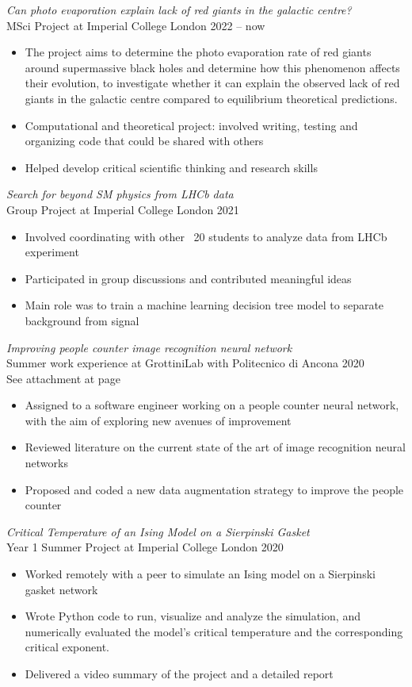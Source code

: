 \documentclass{res} %
\begin{document}
\begin{resume}
{\sl Can photo evaporation explain lack of red giants in the galactic centre?}\\ MSci Project at Imperial College London \hfill 2022 -- now
\begin{itemize}
\item The project aims to determine the photo evaporation rate of red giants around supermassive black holes and determine how this phenomenon affects their evolution, to investigate whether it can explain the observed lack of red giants in the galactic centre compared to equilibrium theoretical predictions.
\item Computational and theoretical project: involved writing, testing and organizing code that could be shared with others
\item Helped develop critical scientific thinking and research skills
\end{itemize}

{\sl Search for beyond SM physics from LHCb data}\\ Group Project at Imperial College London \hfill 2021
\begin{itemize}
\item Involved coordinating with other ~20 students to analyze data from LHCb experiment
\item Participated in group discussions and contributed meaningful ideas
\item Main role was to train a machine learning decision tree model to separate background from signal
\end{itemize}

{\sl Improving people counter image recognition neural network} \\ Summer work experience at GrottiniLab with Politecnico di Ancona \hfill 2020 \\ See attachment at page \pageref{attachment:grottini}
\begin{itemize}
\item Assigned to a software engineer working on a people counter neural network, with the aim of exploring new avenues of improvement
\item Reviewed literature on the current state of the art of image recognition neural networks
\item Proposed and coded a new data augmentation strategy to improve the people counter
\end{itemize}

{\sl Critical Temperature of an Ising Model on a Sierpinski Gasket} \\ Year 1 Summer Project at Imperial College London  \hfill 2020
\begin{itemize}
\item Worked remotely with a peer to simulate an Ising model on a Sierpinski gasket network
\item Wrote Python code to run, visualize and analyze the simulation, and numerically evaluated the model’s critical temperature and the corresponding critical exponent.
\item Delivered a video summary of the project and a detailed report
\end{itemize}



\end{resume}
\end{document}
